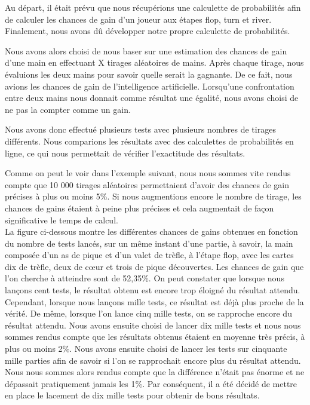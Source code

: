 \documentclass{report}
\begin{document}
Au départ, il était prévu que nous récupérions une calculette de probabilités afin de calculer les chances de gain d'un joueur aux étapes flop, turn et river. Finalement, nous avons dû développer notre propre calculette de probabilités.\par
Nous avons alors choisi de nous baser sur une estimation des chances de gain d'une main en effectuant X tirages aléatoires de mains. Après chaque tirage, nous évaluions les deux mains pour savoir quelle serait la gagnante. De ce fait, nous avions les chances de gain de l'intelligence artificielle. Lorsqu'une confrontation entre deux mains nous donnait comme résultat une égalité, nous avons choisi de ne pas la compter comme un gain.\par
Nous avons donc effectué plusieurs tests avec plusieurs nombres de tirages différents. Nous comparions les résultats avec des calculettes de probabilités en ligne, ce qui nous permettait de vérifier l'exactitude des résultats.\par
Comme on peut le voir dans l'exemple suivant, nous nous sommes vite rendus compte que 10 000 tirages aléatoires permettaient d'avoir des chances de gain précises à plus ou moins 5\%. Si nous augmentions encore le nombre de tirage, les chances de gains étaient à peine plus précises et cela augmentait de façon significative le temps de calcul. \\

La figure ci-dessous montre les différentes chances de gains obtenues en fonction du nombre de tests lancés, sur un même instant d'une partie, à savoir, la main composée d'un as de pique et d'un valet de trèfle, à l'étape flop, avec les cartes dix de trèfle, deux de cœur et trois de pique découvertes. Les chances de gain que l'on cherche à atteindre sont de 52,35\%. On peut constater que lorsque nous lançons cent tests, le résultat obtenu est encore trop éloigné du résultat attendu. Cependant, lorsque nous lançons mille tests, ce résultat est déjà plus proche de la vérité. De même, lorsque l'on lance cinq mille tests, on se rapproche encore du résultat attendu. Nous avons ensuite choisi de lancer dix mille tests et nous nous sommes rendus compte que les résultats obtenus étaient en moyenne très précis, à plus ou moins 2\%. Nous avons ensuite choisi de lancer les tests sur cinquante mille parties afin de savoir si l'on se rapprochait encore plus du résultat attendu. Nous nous sommes alors rendus compte que la différence n'était pas énorme et ne dépassait pratiquement jamais les 1\%. Par conséquent, il a été décidé de mettre en place le lacement de dix mille tests pour obtenir de bons résultats.\\
\end{document}
